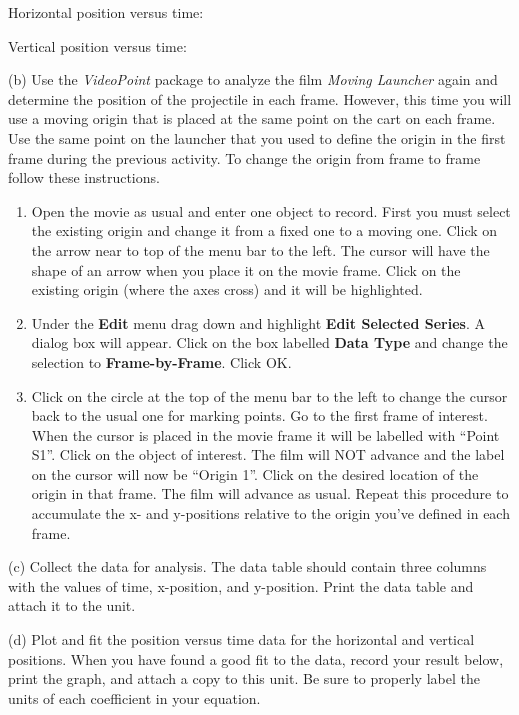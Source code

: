 Horizontal position versus time:
\vspace{10mm}

Vertical position versus time:
\vspace{10mm}

(b) Use the \emph{VideoPoint} package to analyze the film \emph{Moving
Launcher} again and determine the position of the projectile in each
frame. However, this time you will use a moving origin that is placed
at the same point on the cart on each frame. Use the same point on
the launcher that you used to define the origin in the first frame
during the previous activity. To change the origin from frame to frame
follow these instructions.

\begin{enumerate}
\item Open the movie as usual and enter one object to record. First you
must select the existing origin and change it from a fixed one to
a moving one. Click on the arrow near to top of the menu bar to the
left. The cursor will have the shape of an arrow when you place it
on the movie frame. Click on the existing origin (where the axes cross)
and it will be highlighted.
\item Under the \textbf{Edit} menu drag down and highlight \textbf{Edit
Selected Series}. A dialog box will appear. Click on the box labelled
\textbf{Data Type} and change the selection to \textbf{Frame-by-Frame}.
Click OK.
\item Click on the circle at the top of the menu bar to the left to change
the cursor back to the usual one for marking points. Go to the first
frame of interest. When the cursor is placed in the movie frame it
will be labelled with {}``Point S1''. Click on the object of interest.
The film will NOT advance and the label on the cursor will now be
{}``Origin 1''. Click on the desired location of the origin in that
frame. The film will advance as usual. Repeat this procedure to accumulate
the x- and y-positions relative to the origin you've defined in each
frame.
\end{enumerate}
(c) Collect the data for analysis. The data table should contain three
columns with the values of time, x-position, and y-position.
Print the data table and attach it to the
unit.

(d) Plot and fit the position versus time data for the horizontal
and vertical positions. 
When you have found a good fit to the data, record your
result below, print the graph, and attach a copy to this unit. Be
sure to properly label the units of each coefficient in your equation.

